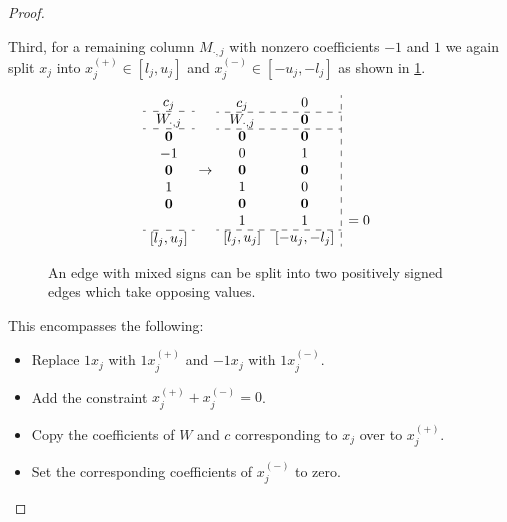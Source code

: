 \documentclass[a4paper,UKenglish,cleveref,thm-restate]{lipics-v2021}
\makeatletter
\newcommand{\veczero}{\mathbf0}
\newenvironment{cdisplaymath}{\@fleqnfalse\begin{displaymath}}{\end{displaymath}}
\makeatother
\begin{document}
\begin{proof}
\begin{claimproof}
        Third, for a remaining column $M_{\cdot,j}$ with nonzero coefficients $-1$ and $1$ we again split $x_j$ into $x_j^{(+)}\in[l_j,u_j]$ and $x_j^{(-)}\in[-u_j,-l_j]$ as shown in \cref{fig:sign-split-mixed}.
        \begin{figure}[H]
            \begin{cdisplaymath}
                \begin{array}{c}
                    c_j\\
                    \hdashline{}
                    W_{\cdot,j}\\
                    \hdashline{}
                    \veczero\\
                    -1\\
                    \veczero\\
                    1\\
                    \veczero\\
                    \\
                    \hdashline{}
                    [l_j,u_j]
                \end{array}
                \to
                \begin{array}{c c:l}
                    c_j&0&\\
                    \cdashline{1-2}{}
                    W_{\cdot,j}&\veczero&\\
                    \cdashline{1-2}{}
                    \veczero&\veczero&\\
                    0&1&\\
                    \veczero&\veczero&\\
                    1&0&\\
                    \veczero&\veczero&\\
                    1&1&=0\\
                    \cdashline{1-2}{}
                    [l_j,u_j]&[-u_j,-l_j]
                \end{array}
            \end{cdisplaymath}
            \caption{An edge with mixed signs can be split into two positively signed edges which take opposing values.}
            \label{fig:sign-split-mixed}
        \end{figure}
        This encompasses the following:
        \begin{itemize}
            \item Replace $1x_j$ with $1x_j^{(+)}$ and $-1x_j$ with $1x_j^{(-)}$.
            \item Add the constraint $x_j^{(+)}+x_j^{(-)}=0$.
            \item Copy the coefficients of $W$ and $c$ corresponding to $x_j$ over to $x_j^{(+)}$.
            \item Set the corresponding coefficients of $x_j^{(-)}$ to zero.
        \end{itemize}
        

\end{claimproof}
\end{proof}
\end{document}
